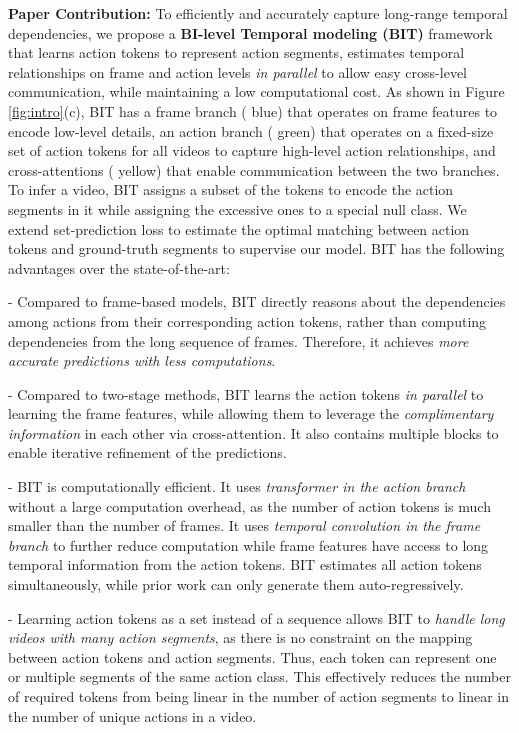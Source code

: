 \documentclass[10pt,twocolumn,letterpaper]{article}
\newcommand{\headline}[1]{\noindent \textbf{#1}}
\newcommand{\0}{\boldsymbol{0}}
\begin{document}
\headline{Paper Contribution:}
To efficiently and accurately capture long-range temporal dependencies, we propose a \textbf{BI-level Temporal modeling (BIT)} framework that  
learns action tokens to represent action segments, estimates temporal relationships on frame and action levels \textit{in parallel} to allow easy cross-level communication, while maintaining a low computational cost. 
As shown in Figure \ref{fig:intro}(c),
BIT has a frame branch ({\color{blue} blue}) that operates on frame features to encode low-level details, an action branch ({\color{green} green}) that operates on a fixed-size set of action tokens for all videos to capture high-level action relationships, and cross-attentions ({\color{orange} yellow}) that enable communication between the two branches.
To infer a video, BIT assigns a subset of the tokens to encode the action segments in it while assigning the excessive ones to a special null class. 
We extend set-prediction loss \cite{Carion:CoRR20} to estimate the optimal matching between action tokens and ground-truth segments to supervise our model.
BIT has the following advantages over the state-of-the-art:




- Compared to frame-based models, BIT directly reasons about the dependencies among actions from their corresponding action tokens, rather than computing dependencies from the long sequence of frames. Therefore, it achieves \emph{more accurate predictions with less computations}. 

- Compared to two-stage methods, BIT learns the action tokens \emph{in parallel} to learning the frame features, while allowing them to leverage the \emph{complimentary information} in each other via cross-attention. It also contains multiple blocks to enable iterative refinement of the predictions.


- BIT is computationally efficient.
It uses \emph{transformer in the action branch} without a large computation overhead, as the number of action tokens is much smaller than the number of frames. 
It uses \emph{temporal convolution in the frame branch} to further reduce computation while frame features have access to long temporal information from the action tokens. 
BIT estimates all action tokens simultaneously, while prior work \cite{Behrmann:ECCV22} can only generate them auto-regressively. 

- Learning action tokens as a set instead of a sequence allows BIT to \emph{handle long videos with many action segments}, as there is no constraint on the mapping between action tokens and action segments. Thus, each token can represent one or multiple segments of the same action class.  This effectively reduces the number of required tokens from being linear in the number of action segments to linear in the number of unique actions in a video. 
\end{document}
